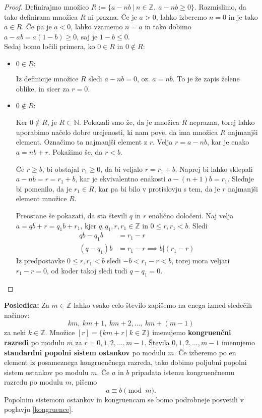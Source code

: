 \documentclass[12pt, a4paper]{article}
\newenvironment{posl}[1][]{\par\medskip\noindent \textbf{Posledica: }}{\medskip}
\begin{document}
\begin{proof}
Definirajmo množico $R:=\{ a-nb \ | \ n\in \mathbb{Z},\ a-nb \geq 0 \}$. Razmislimo, da tako definirana množica $R$ ni prazna. Če je $a>0$, lahko izberemo $n=0$ in je tako $a\in R$.  Če pa je $a<0$, lahko vzamemo $n=a$ in tako dobimo $a - ab = a(1-b)\geq 0$, saj je $1-b\leq 0$.
\\
Sedaj bomo ločili primera, ko $0\in R$ in $0\notin R$:
\begin{itemize}
\item $0\in R:$

Iz definicije množice $R$ sledi $a-nb=0$, oz. $a=nb$. To je že zapis želene oblike, in sicer za $r=0$.

\item $0\notin R:$

Ker $0\notin R$, je $R\subset \mathbb{N}$. Pokazali smo že, da je množica $R$ neprazna, torej lahko uporabimo načelo dobre urejenosti, ki nam pove, da ima množica $R$ najmanjši element. Označimo ta najmanjši element z $r$. Velja $r=a-nb$, kar je enako $a=nb + r$. Pokažimo še, da $r<b$.

Če $r\geq b$, bi obstajal $r_1 \geq 0$, da bi veljalo $r = r_1 + b$. Naprej bi lahko sklepali $a-nb=r=r_1 + b$, kar je ekvivalentno enakosti $a-(n+1)b=r_1$. Slednje bi pomenilo, da je $r_1\in R$, kar pa bi bilo v protislovju s tem, da je $r$ najmanjši element množice $R$.

Preostane še pokazati, da sta števili $q$ in $r$ enolično določeni. Naj velja $a=qb + r=q_1 b + r_1$, kjer $q,q_1,r,r_1\in \mathbb{Z}$ in $0\leq r, r_1 < b$. Sledi
\begin{align*}
qb-q_1 b&=r_1 - r \\
(q-q_1)b&=r_1 - r \implies b|(r_1 - r)
\end{align*}
Iz predpostavke $0\leq r, r_1 < b$ sledi $-b < r_1 - r < b$, torej mora veljati $r_1 - r = 0$, od koder takoj sledi tudi $q-q_1 = 0$.
\end{itemize}
\end{proof}

\begin{posl}
Za $m\in \mathbb{Z}$ lahko vsako celo število zapišemo na enega izmed sledečih načinov:
$$km,\ km+1,\  km+2,\dots,\  km + (m-1)$$
za neki $k\in \mathbb{Z}.$ Množice $[r] = \{km+r \ | \ k\in \mathbb{Z}\}$ imenujemo \textbf{kongruenčni razredi} po modulu $m$ za $r=0,1,2,\dots,m-1$. Števila $0,1,2,\dots,m-1$ imenujemo \textbf{standardni popolni sistem ostankov} po modulu $m$. Če izberemo po en element iz posameznega kongruenčnega razreda, tako dobimo poljubni popolni sistem ostankov po modulu $m$. Če $a$ in $b$ pripadata istemu kongruenčnemu razredu po modulu $m$, pišemo $$ a\equiv b \pmod{m}.$$ Popolnim sistemom ostankov in kongruencam se bomo podrobneje posvetili v poglavju \ref{kongruence}.
\end{posl}
\end{document}

